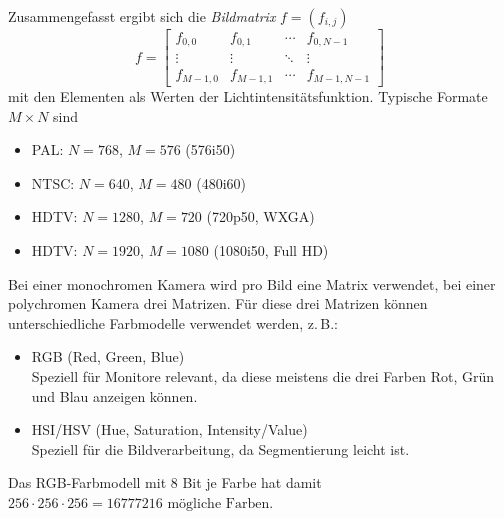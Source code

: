 \documentclass[a4paper, 11pt, accentcolor = tud3b]{tudreport}
\begin{document}
					Zusammengefasst ergibt sich die \emph{Bildmatrix} \( f = (f_{i, j}) \)
					\begin{equation*}
						f =
							\begin{bmatrix}
								f_{0, 0}     & f_{0, 1}     & \cdots & f_{0, N - 1}     \\
								\vdots       & \vdots       & \ddots & \vdots           \\
								f_{M - 1, 0} & f_{M - 1, 1} & \cdots & f_{M - 1, N - 1}
							\end{bmatrix}
					\end{equation*}
					mit den Elementen als Werten der Lichtintensitätsfunktion. Typische Formate \( M \times N \) sind
					\begin{itemize}
						\item PAL:  \tabto{1.5cm} \( N = \num{768} \),  \tabto{3.5cm} \( M = \num{576} \)  \tabto{5.5cm} (576i50)
						\item NTSC: \tabto{1.5cm} \( N = \num{640} \),  \tabto{3.5cm} \( M = \num{480} \)  \tabto{5.5cm} (480i60)
						\item HDTV: \tabto{1.5cm} \( N = \num{1280} \), \tabto{3.5cm} \( M = \num{720} \)  \tabto{5.5cm} (720p50, WXGA)
						\item HDTV: \tabto{1.5cm} \( N = \num{1920} \), \tabto{3.5cm} \( M = \num{1080} \) \tabto{5.5cm} (1080i50, Full HD)
					\end{itemize}
					Bei einer monochromen Kamera wird pro Bild eine Matrix verwendet, bei einer polychromen Kamera drei Matrizen. Für diese drei Matrizen können unterschiedliche Farbmodelle verwendet werden, z.\,B.:
					\begin{itemize}
						\item RGB (Red, Green, Blue) \\ Speziell für Monitore relevant, da diese meistens die drei Farben Rot, Grün und Blau anzeigen können.
						\item HSI/HSV (Hue, Saturation, Intensity/Value) \\ Speziell für die Bildverarbeitung, da Segmentierung leicht ist.
					\end{itemize}
					Das RGB-Farbmodell mit \num{8} Bit je Farbe hat damit \( \num{256} \cdot \num{256} \cdot \num{256} = \num{16777216}\text{ mögliche Farben} \).
					
\end{document}
